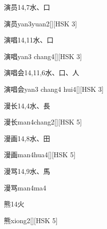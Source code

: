 \begin{entry}{演员}{14,7}{⽔、⼝}
  \begin{phonetics}{演员}{yan3yuan2}[][HSK 3]
  \end{phonetics}
\end{entry}

\begin{entry}{演唱}{14,11}{⽔、⼝}
  \begin{phonetics}{演唱}{yan3 chang4}[][HSK 3]
  \end{phonetics}
\end{entry}

\begin{entry}{演唱会}{14,11,6}{⽔、⼝、⼈}
  \begin{phonetics}{演唱会}{yan3 chang4 hui4}[][HSK 3]
  \end{phonetics}
\end{entry}

\begin{entry}{漫长}{14,4}{⽔、⾧}
  \begin{phonetics}{漫长}{man4chang2}[][HSK 5]
  \end{phonetics}
\end{entry}

\begin{entry}{漫画}{14,8}{⽔、⽥}
  \begin{phonetics}{漫画}{man4hua4}[][HSK 5]
  \end{phonetics}
\end{entry}

\begin{entry}{漫骂}{14,9}{⽔、⾺}
  \begin{phonetics}{漫骂}{man4ma4}
  \end{phonetics}
\end{entry}

\begin{entry}{熊}{14}{⽕}
  \begin{phonetics}{熊}{xiong2}[][HSK 5]
  \end{phonetics}
\end{entry}

